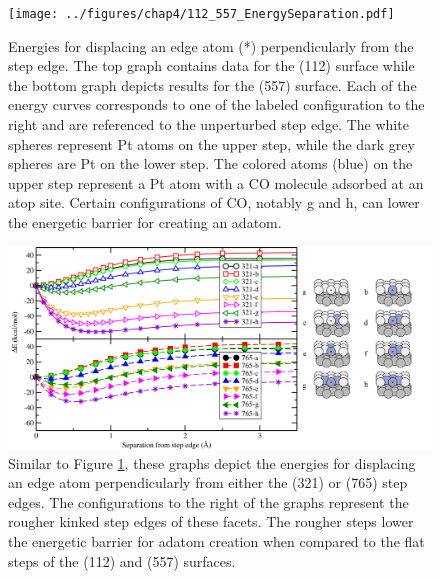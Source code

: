 \begin{landscape}
\begin{figure}[p!]
  \centering
  \texttt{[image: ../figures/chap4/112\_557\_EnergySeparation.pdf]}
  \caption{Energies for displacing an edge atom (*) perpendicularly from the
step edge. The top graph contains data for the (112) surface while the bottom
graph depicts results for the (557) surface.  Each of the energy curves
corresponds to one of the labeled configuration to the right and are referenced
to the unperturbed step edge. The white spheres represent Pt atoms on the upper
step, while the dark grey spheres are Pt on the lower step.  The colored atoms
(blue) on the upper step represent a Pt atom with a CO molecule adsorbed at an
atop site. Certain configurations of CO, notably g and h, can lower the
energetic barrier for creating an adatom.}
\label{fig:112_557_ES}
\end{figure}
\end{landscape}

\begin{landscape}
\begin{figure}[p!]
  \centering
  \includegraphics[width=\linewidth]{../figures/chap4/321_765_EnergySeparation.pdf}
  \caption{Similar to Figure \ref{fig:112_557_ES}, these graphs depict the
energies for displacing an edge atom perpendicularly from either the (321) or
(765) step edges. The configurations to the right of the graphs represent the
rougher kinked step edges of these facets. The rougher steps lower the 
energetic barrier for adatom creation when compared to the flat steps of the
(112) and (557) surfaces.}
\label{fig:321_765_ES}
\end{figure}
\end{landscape}

